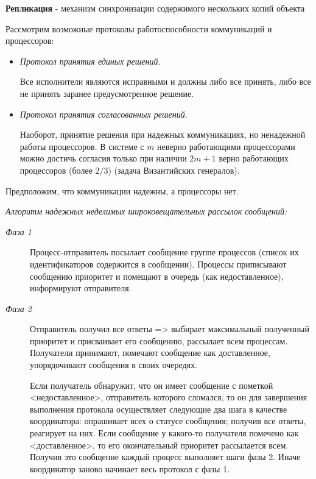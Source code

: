 \textbf{Репликация} - механизм синхронизации содержимого нескольких копий объекта

Рассмотрим возможные протоколы работоспособности коммуникаций и процессоров:

\begin{itemize}
    \item \textit{Протокол принятия единых решений}. 
    
    Все исполнители являются исправными и должны либо все принять, либо все не принять заранее предусмотренное решение.

    \item \textit{Протокол принятия согласованных решений}. 
    
    Наоборот, принятие решения при надежных коммуникациях, но ненадежной работы процессоров. 
    В системе с $m$ неверно работающими процессорами можно достичь согласия только при наличии $2m+1$ верно работающих процессоров (более $2/3$) (задача Византийских генералов).
\end{itemize}

Предположим, что коммуникации надежны, а процессоры нет.

\textit{Алгоритм надежных неделимых широковещательных рассылок сообщений:}
\begin{description}
    \item[\textit{Фаза 1}] Процесс-отправитель посылает сообщение группе процессов (список их идентификаторов содержится в сообщении). 
    Процессы приписывают сообщению приоритет и помещают в очередь (как недоставленное), информируют отправителя.
    \item[\textit{Фаза 2}] Отправитель получил все ответы => выбирает максимальный полученный приоритет и присваивает его сообщению, рассылает всем процессам.
    Получатели принимают, помечают сообщение как доставленное, упорядочивают сообщения в своих очередях.
    \item[] Если получатель обнаружит, что он имеет сообщение с пометкой <недоставленное>, отправитель которого сломался, то он для завершения выполнения протокола осуществляет следующие два шага в качестве координатора: опрашивает всех о статусе сообщения; получив все ответы, реагирует на них. 
    Если сообщение у какого-то получателя помечено как <доставленное>, то его окончательный приоритет рассылается всем. 
    Получив это сообщение каждый процесс выполняет шаги фазы 2. 
    Иначе координатор заново начинает весь протокол с фазы 1.
\end{description}


